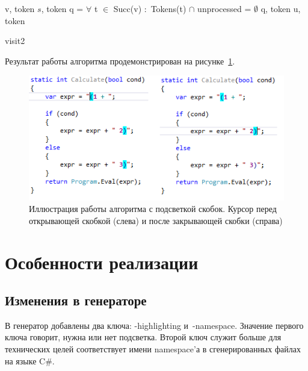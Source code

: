 \begin{algorithm}
\begin{algorithmic}[1]
 {v, token}
    \State {}
        \State {} {$s$, token}
        \Else 
            \State q = $\forall$ t $\in$ Succ(v) $\colon$ Tokens(t) $\cap$ unprocessed = $\emptyset$
            \State {} {q, token}
        \EndIf
    \EndIf
\Else 
        \State {} {u, token}
    \EndFor
\EndIf 
{}
\EndFunction

\end{algorithmic}
\caption{visit2}
\end{algorithm}

Результат работы алгоритма продемонстрирован на рисунке~\ref{ex}.

\begin{figure}[t]
    \centering
    \includegraphics[width=\linewidth]{Ivanov/Pictures/demo.png}
    \caption{Иллюстрация работы алгоритма с подсветкой скобок. Курсор перед открывающей скобкой (слева) и после закрывающей скобки (справа)}
    \label{ex}
\end{figure}

\section{Особенности реализации}
\subsection{Изменения в генераторе}

В генератор добавлены два ключа: -highlighting и~-namespace. Значение первого ключа говорит, нужна или нет подсветка. Второй ключ служит больше для технических целей соответствует имени namespace’а в сгенерированных файлах на языке C\#.

